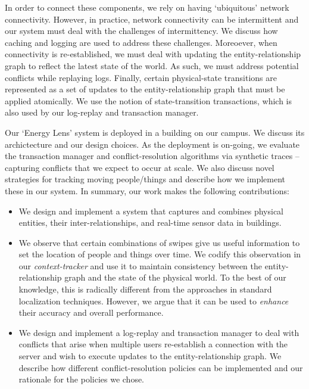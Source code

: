 In order to connect these components, we rely on having `ubiquitous' network connectivity.  However, in practice, network
connectivity can be intermittent and our system must deal with the challenges of intermittency.  We discuss how caching
and logging are used to address these challenges.  Moreoever, when connectivity is re-established, we must deal with
updating the entity-relationship graph to reflect the latest state of the world.  As such, we must address potential
conflicts while replaying logs.  Finally, certain physical-state transitions are represented as a set of updates to the entity-relationship
graph that must be applied atomically.  We use the notion of state-transition transactions, which is also used by our
log-replay and transaction manager.

Our `Energy Lens' system is deployed in a building on our campus.  We discuss
its archictecture and our design choices.  As the deployment is on-going, we evaluate the
transaction manager and conflict-resolution algorithms via synthetic traces -- capturing conflicts that we expect to occur
at scale.  %
We also
discuss novel strategies for tracking moving people/things and describe how we implement these in our system.  In summary, our work
makes the following contributions:

\begin{itemize}
\item We design and implement a system that captures and combines physical entities, their inter-relationships, and real-time sensor data 
		in buildings.%
\item We observe that certain combinations of swipes give us useful information to set the location of people and things over time.
		We codify this observation in our \emph{context-tracker} and use it to maintain consistency between the entity-relationship graph and the 
		state of the physical world.  To the best of our knowledge, this is radically different from the approaches in standard 
		localization techniques.  However, we argue that it can be used to \emph{enhance} their accuracy and overall performance.
\item We design and implement a log-replay and transaction manager to deal with conflicts that arise when multiple users re-establish
		a connection with the server and wish to execute updates to the entity-relationship graph.  We describe how different 
		conflict-resolution policies can be implemented and our rationale for the policies we chose.
\end{itemize}

